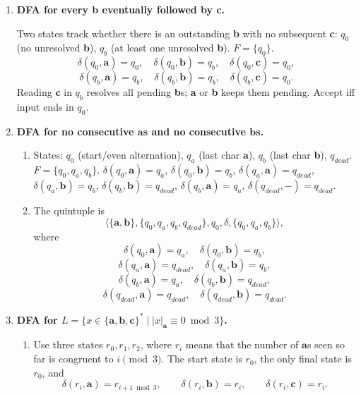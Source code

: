 \documentclass[11pt,openany]{book}
\begin{document}
\begin{enumerate}[{1.}1.]
\item \textbf{DFA for every \textbf{b} eventually followed by \textbf{c}.}

Two states track whether there is an outstanding \textbf{b} with no subsequent \textbf{c}:
$q_0$ (no unresolved \textbf{b}), $q_b$ (at least one unresolved \textbf{b}). $F=\{q_0\}$.
\[
\delta(q_0,\mathbf{a})=q_0,\quad\delta(q_0,\mathbf{b})=q_b,\quad\delta(q_0,\mathbf{c})=q_0,
\]
\[
\delta(q_b,\mathbf{a})=q_b,\quad\delta(q_b,\mathbf{b})=q_b,\quad\delta(q_b,\mathbf{c})=q_0.
\]
Reading \textbf{c} in $q_b$ resolves all pending \textbf{b}s; \textbf{a} or \textbf{b} keeps them pending.
Accept iff input ends in $q_0$.

\item \textbf{DFA for no consecutive $\mathbf{a}$s and no consecutive $\mathbf{b}$s.}

\begin{enumerate}
\item States: $q_0$ (start/even alternation), $q_a$ (last char \textbf{a}), $q_b$ (last char \textbf{b}), $q_{dead}$. $F=\{q_0,q_a,q_b\}$.
$\delta(q_0,\mathbf{a})=q_a$, $\delta(q_0,\mathbf{b})=q_b$,
$\delta(q_a,\mathbf{a})=q_{dead}$, $\delta(q_a,\mathbf{b})=q_b$,
$\delta(q_b,\mathbf{b})=q_{dead}$, $\delta(q_b,\mathbf{a})=q_a$,
$\delta(q_{dead},-)=q_{dead}$.

\item The quintuple is
\[
\langle\{\mathbf{a},\mathbf{b}\},\{q_0,q_a,q_b,q_{dead}\},q_0,\delta,\{q_0,q_a,q_b\}\rangle,
\]
where
\[
\delta(q_0,\mathbf{a})=q_a,\quad \delta(q_0,\mathbf{b})=q_b,
\]
\[
\delta(q_a,\mathbf{a})=q_{dead},\quad \delta(q_a,\mathbf{b})=q_b,
\]
\[
\delta(q_b,\mathbf{a})=q_a,\quad \delta(q_b,\mathbf{b})=q_{dead},
\]
\[
\delta(q_{dead},\mathbf{a})=q_{dead},\quad \delta(q_{dead},\mathbf{b})=q_{dead}.
\]
\end{enumerate}

\item \textbf{DFA for $L=\{x\in\{\pmb{a},\pmb{b},\pmb{c}\}^*\mid |x|_{\pmb{a}}\equiv 0 \bmod 3\}$.}

\begin{enumerate}
\item Use three states $r_0,r_1,r_2$, where $r_i$ means that the number of $\pmb{a}$s seen so far is congruent to $i \pmod 3$. The start state is $r_0$, the only final state is $r_0$, and
\[
\delta(r_i,\pmb{a})=r_{i+1 \bmod 3},\qquad
\delta(r_i,\pmb{b})=r_i,\qquad
\delta(r_i,\pmb{c})=r_i.
\]


\end{enumerate}
\end{enumerate}
\end{document}

